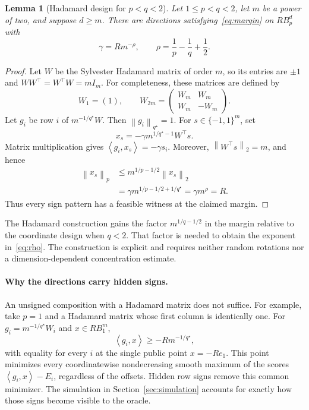 \documentclass[11pt,a4paper]{article}
\newtheorem{lemma}[theorem]{Lemma}
\theoremstyle{definition}
\theoremstyle{remark}
\newcommand{\norm}[1]{\left\lVert #1\right\rVert}
\newcommand{\ip}[2]{\left\langle #1,#2\right\rangle}
\begin{document}
\begin{lemma}[Hadamard design for $p<q<2$]\label{lem:hadamard}
Let $1\le p<q<2$, let $m$ be a power of two, and suppose $d\ge m$.
There are directions satisfying~\eqref{eq:margin} on $RB_p^d$ with
\[
   \gamma=Rm^{-\rho},\qquad
   \rho=\frac1p-\frac1q+\frac12.
\]
\end{lemma}

\begin{proof}
Let $W$ be the Sylvester Hadamard matrix of order $m$, so its entries are
$\pm1$ and $WW^\top=W^\top W=mI_m$. For completeness, these matrices are
defined by
\[
  W_1=(1),\qquad
  W_{2m}=\begin{pmatrix}W_m&W_m\\W_m&-W_m\end{pmatrix}.
\]
Let $g_i$ be row $i$ of $m^{-1/q^\star}W$. Then
$\norm{g_i}_{q^\star}=1$.
For $s\in\{-1,1\}^m$, set
\[
   x_s=-\gamma m^{1/q^\star-1}W^\top s.
\]
Matrix multiplication gives $\ip{g_i}{x_s}=-\gamma s_i$.
Moreover, $\norm{W^\top s}_2=m$, and hence
\begin{align*}
 \norm{x_s}_p
 &\le m^{1/p-1/2}\norm{x_s}_2\\
 &=\gamma m^{1/p-1/2+1/q^\star}
 =\gamma m^\rho=R.
\end{align*}
Thus every sign pattern has a feasible witness at the claimed margin.
\end{proof}

The Hadamard construction gains the factor $m^{1/q-1/2}$ in the margin
relative to the coordinate design when $q<2$. That factor is needed to obtain
the exponent in~\eqref{eq:rho}. The construction is explicit and requires
neither random rotations nor a dimension-dependent concentration estimate.

\paragraph{Why the directions carry hidden signs.}
An unsigned composition with a Hadamard matrix does not suffice. For example,
take $p=1$ and a Hadamard matrix whose first column is identically one.
For $g_i=m^{-1/q^\star}W_i$ and $x\in RB_1^m$,
\[
 \ip{g_i}{x}\ge-Rm^{-1/q^\star},
\]
with equality for every $i$ at the single public point $x=-Re_1$.
This point minimizes every coordinatewise nondecreasing smooth maximum of
the scores $\ip{g_i}{x}-E_i$, regardless of the offsets. Hidden row signs
remove this common minimizer. The simulation in
Section~\ref{sec:simulation} accounts for exactly how those signs become
visible to the oracle.
\end{document}
